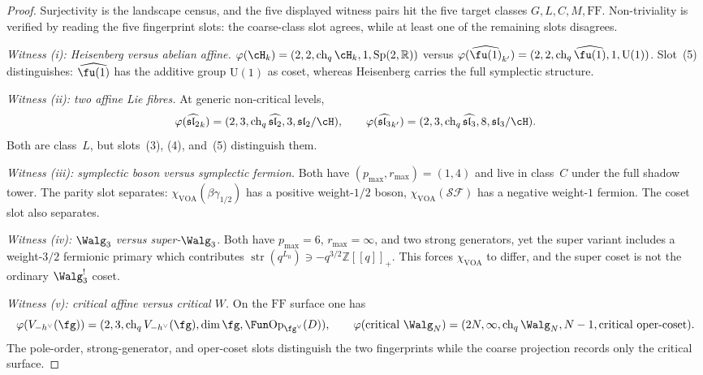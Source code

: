 \begin{proof}
Surjectivity is the landscape census, and the five displayed witness
pairs hit the five target classes $G,L,C,M,\mathrm{FF}$. Non-triviality
is verified by reading the five fingerprint slots: the coarse-class
slot agrees, while at least one of the remaining slots disagrees.

\emph{Witness (i): Heisenberg versus abelian affine.}
$\varphi(\cH_k) = (2, 2, \operatorname{ch}_q\cH_k, 1, \mathrm{Sp}(2,\mathbb{R}))$
versus
$\varphi(\widehat{\fu(1)}_{k'}) = (2, 2, \operatorname{ch}_q\widehat{\fu(1)}, 1, \mathrm{U}(1))$.
Slot~(5) distinguishes: $\widehat{\fu(1)}$ has the additive group
$\mathrm{U}(1)$ as coset, whereas Heisenberg carries the full
symplectic structure.

\emph{Witness (ii): two affine Lie fibres.}
At generic non-critical levels,
\[
\varphi(\widehat{\mathfrak{sl}_2}_k)
  = (2,3,\operatorname{ch}_q\widehat{\mathfrak{sl}_2},3,
     \mathfrak{sl}_2/\cH),
\qquad
\varphi(\widehat{\mathfrak{sl}_3}_{k'})
  = (2,3,\operatorname{ch}_q\widehat{\mathfrak{sl}_3},8,
     \mathfrak{sl}_3/\cH).
\]
Both are class~$L$, but slots~(3), (4), and~(5) distinguish them.

\emph{Witness (iii): symplectic boson versus symplectic fermion.}
Both have $(p_{\max}, r_{\max}) = (1, 4)$ and live in class~$C$
under the full shadow tower.
The parity slot separates:
$\chi_{\mathrm{VOA}}(\beta\gamma_{1/2})$ has a positive weight-$1/2$
boson, $\chi_{\mathrm{VOA}}(\mathcal{SF})$ has a negative weight-$1$
fermion. The coset slot also separates.

\emph{Witness (iv): $\Walg_3$ versus super-$\Walg_3$.}
Both have $p_{\max}=6$, $r_{\max}=\infty$, and two strong generators,
yet the super variant includes a weight-$3/2$ fermionic primary
which contributes
$\operatorname{str}(q^{L_0}) \ni -q^{3/2}\mathbb{Z}[\![q]\!]_+$.
This forces $\chi_{\mathrm{VOA}}$ to differ, and the super coset is
not the ordinary $\Walg_3^!$ coset.

\emph{Witness (v): critical affine versus critical $W$.}
On the $\mathrm{FF}$ surface one has
\[
\varphi(V_{-h^\vee}(\fg))
  = (2,3,\operatorname{ch}_q V_{-h^\vee}(\fg),\dim\fg,
     \Fun\mathrm{Op}_{\fg^\vee}(D)),
\qquad
\varphi(\textup{critical }\Walg_N)
  = (2N,\infty,\operatorname{ch}_q\Walg_N,N-1,
     \textup{critical oper-coset}).
\]
The pole-order, strong-generator, and oper-coset slots distinguish
the two fingerprints while the coarse projection records only the
critical surface.
\end{proof}

